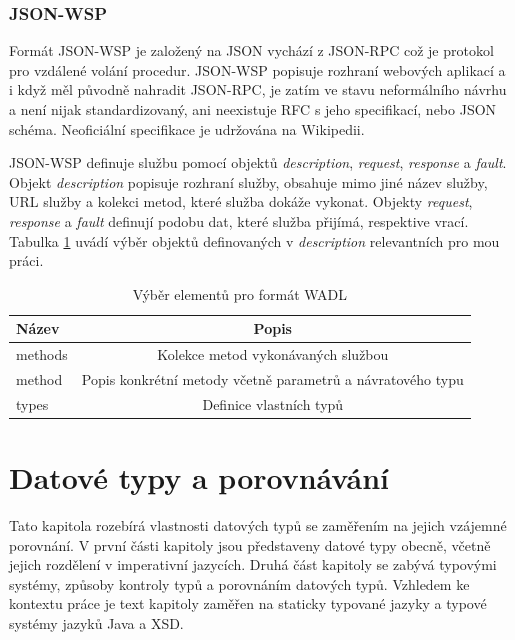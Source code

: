 \documentclass[czech,DP]{thesiskiv}
\begin{document}
\subsection{JSON-WSP}

Formát JSON-WSP je založený na JSON vychází z JSON-RPC což je protokol pro vzdálené volání procedur. JSON-WSP popisuje rozhraní webových aplikací a i když měl původně nahradit JSON-RPC, je zatím ve stavu neformálního návrhu a není nijak standardizovaný, ani neexistuje RFC s jeho specifikací, nebo JSON schéma. Neoficiální specifikace je udržována na Wikipedii\cite{jsonWspSpec}.


JSON-WSP definuje službu pomocí objektů \textit{description}, \textit{request}, \textit{response} a \textit{fault}. Objekt \textit{description} popisuje rozhraní služby, obsahuje mimo jiné název služby, URL služby a kolekci metod, které služba dokáže vykonat. Objekty \textit{request}, \textit{response} a \textit{fault} definují podobu dat, které služba přijímá, respektive vrací. Tabulka \ref{tab:jsonwsp-elements} uvádí výběr objektů definovaných v \textit{description} relevantních pro mou práci.

\begin{table}[h]
	\centering
	\begin{tabular}{|l|c|}
		\hline
		Název & Popis \\
		\hline
		\hline
		methods & Kolekce metod vykonávaných službou \\
		\hline
		method & Popis konkrétní metody včetně parametrů a návratového typu \\
		\hline
		types & Definice vlastních typů \\
		\hline
	\end{tabular}
	\caption{Výběr elementů pro formát WADL}
	\label{tab:jsonwsp-elements} 
\end{table}
 
 
\chapter{Datové typy a porovnávání}

Tato kapitola rozebírá vlastnosti datových typů se zaměřením na jejich vzájemné porovnání. V první části kapitoly jsou představeny datové typy obecně, včetně jejich rozdělení v imperativní jazycích. Druhá část kapitoly se zabývá typovými systémy, způsoby kontroly typů a porovnáním datových typů. Vzhledem ke kontextu práce je text kapitoly zaměřen na staticky typované jazyky a typové systémy jazyků Java a XSD.
\end{document}
